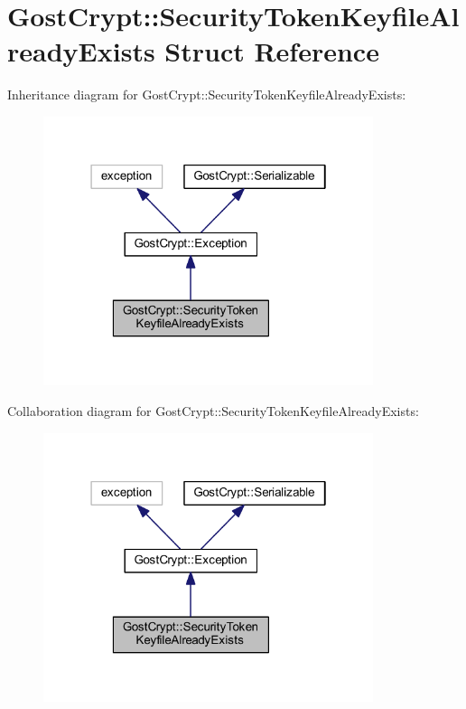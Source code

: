 \hypertarget{struct_gost_crypt_1_1_security_token_keyfile_already_exists}{}\section{Gost\+Crypt\+:\+:Security\+Token\+Keyfile\+Already\+Exists Struct Reference}
\label{struct_gost_crypt_1_1_security_token_keyfile_already_exists}


Inheritance diagram for Gost\+Crypt\+:\+:Security\+Token\+Keyfile\+Already\+Exists\+:
\nopagebreak
\begin{figure}[H]
\begin{center}
\leavevmode
\includegraphics[width=274pt]{struct_gost_crypt_1_1_security_token_keyfile_already_exists__inherit__graph}
\end{center}
\end{figure}


Collaboration diagram for Gost\+Crypt\+:\+:Security\+Token\+Keyfile\+Already\+Exists\+:
\nopagebreak
\begin{figure}[H]
\begin{center}
\leavevmode
\includegraphics[width=274pt]{struct_gost_crypt_1_1_security_token_keyfile_already_exists__coll__graph}
\end{center}
\end{figure}
